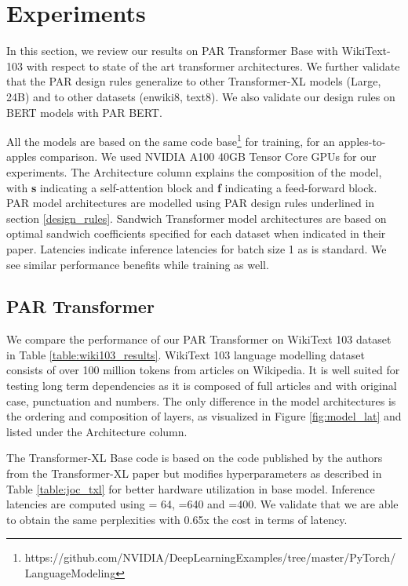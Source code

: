 \documentclass{article}
\begin{document}
\section{Experiments}

In this section, we review our results on PAR Transformer Base with WikiText-103 with respect to state of the art transformer architectures. We further validate that the PAR design rules generalize to other Transformer-XL models (Large, 24B) and to other datasets (enwiki8, text8). We also validate our design rules on BERT models with PAR BERT. 

All the models are based on the same code base\footnote{https://github.com/NVIDIA/DeepLearningExamples/tree/master/PyTorch/LanguageModeling} for training, for an apples-to-apples comparison. We used NVIDIA A100 40GB Tensor Core GPUs for our experiments. The Architecture column explains the composition of the model, with \textbf{s} indicating a self-attention block and \textbf{f} indicating a feed-forward block. PAR model architectures are modelled using PAR design rules underlined in section \ref{design_rules}. Sandwich Transformer model architectures are based on optimal sandwich coefficients specified for each dataset when indicated in their paper. Latencies indicate inference latencies for batch size 1 as is standard. We see similar performance benefits while training as well.

\subsection{PAR Transformer}

We compare the performance of our PAR Transformer on WikiText 103 dataset \cite{wikitext} in Table \ref{table:wiki103_results}. WikiText 103 language modelling dataset consists of over 100 million tokens from articles on Wikipedia. It is well suited for testing long term dependencies as it is composed of full articles and with original case, punctuation and numbers. The only difference in the model architectures is the ordering and composition of layers, as visualized in Figure \ref{fig:model_lat} and listed under the Architecture column. 

The Transformer-XL Base code is based on the code published by the authors from the Transformer-XL paper but modifies hyperparameters as described in Table \ref{table:joc_txl} for better hardware utilization in base model. Inference latencies are computed using  = 64, =640 and =400. We validate that we are able to obtain the same perplexities with 0.65x the cost in terms of latency. 
\end{document}
